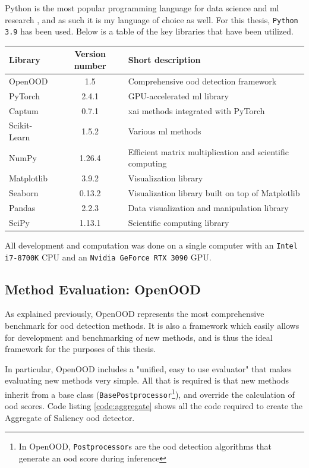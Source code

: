 \documentclass[UKenglish]{uiomasterthesis} %
\theoremstyle{definition}
\begin{document}
Python is the most popular programming language for data science and \ac{ml} research \cite{nguyen2019machine}, and as such it is my language of choice as well. For this thesis, \texttt{Python 3.9} has been used. Below is a table of the key libraries that have been utilized.

\begin{center}
    \begin{tabular}{ |l|c|l| } 
    \hline
    Library & Version number & Short description \\
    \hline
    OpenOOD & 1.5 & Comprehensive \ac{ood} detection framework \\ 
    PyTorch & 2.4.1 & GPU-accelerated \ac{ml} library \\ 
    Captum & 0.7.1 & \ac{xai} methods integrated with PyTorch \\ 
    Scikit-Learn & 1.5.2 & Various \ac{ml} methods \\ 
    NumPy & 1.26.4 & Efficient matrix multiplication and scientific computing \\ 
    Matplotlib & 3.9.2  & Visualization library \\ 
    Seaborn & 0.13.2 & Visualization library built on top of Matplotlib \\
    Pandas & 2.2.3 & Data visualization and manipulation library \\
    SciPy & 1.13.1 & Scientific computing library \\
    \hline
    \end{tabular}
\end{center}

All development and computation was done on a single computer with an \texttt{Intel i7-8700K} CPU and an \texttt{Nvidia GeForce RTX 3090} GPU.

\subsection{Method Evaluation: OpenOOD}

As explained previously, OpenOOD \cite{openood} represents the most comprehensive benchmark for \ac{ood} detection methods. It is also a framework which easily allows for development and benchmarking of new methods, and is thus the ideal framework for the purposes of this thesis.

In particular, OpenOOD includes a "unified, easy to use evaluator" \cite{openood15} that makes evaluating new methods very simple. All that is required is that new methods inherit from a base class (\texttt{BasePostprocessor}\footnote{In OpenOOD, \texttt{Postprocessor}s are the \ac{ood} detection algorithms that generate an \ac{ood} score during inference}), and override the calculation of \ac{ood} scores. Code listing \ref{code:aggregate} shows all the code required to create the Aggregate of Saliency \ac{ood} detector.
\end{document}
